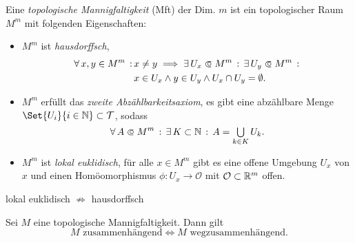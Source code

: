 \documentclass{cheat-sheet}
\newcommand{\Tau}{\mathcal{T}} %
\renewcommand{\O}{\mathcal{O}} %
\begin{document}


\begin{defn}
  Eine \emph{topologische Mannigfaltigkeit} (Mft) der Dim. $m$ ist ein topologischer Raum $M^m$ mit folgenden Eigenschaften:
  \begin{itemize}
    \item $M^m$ ist \emph{hausdorffsch}, \dh{}
    \begin{align*}
      \fa{x, y \in M^m} &x \not= y \implies \ex{U_x \opn M^m} \ex{U_y \opn M^m}\\
      &x \in U_x \wedge y \in U_y \wedge U_x \cap U_y = \emptyset.
    \end{align*}
    \item $M^m$ erfüllt das \emph{zweite Abzählbarkeitsaxiom}, \dh{} es gibt eine abzählbare Menge $\Set{ U_i }{ i \in \N } \subset \Tau$, sodass
    \[ \fa{A \opn M^m} \ex{K \subset \N} A = \bigcup_{k \in K} U_k. \]
    \item $M^m$ ist \emph{lokal euklidisch}, \dh{} für alle $x \in M^m$ gibt es eine offene Umgebung $U_x$ von $x$ und einen Homöomorphismus $\phi : U_x \to \O$ mit $\O \subset \R^m$ offen.
  \end{itemize}
\end{defn}

\begin{bem}
  lokal euklidisch $\not\Rightarrow$ hausdorffsch
\end{bem}

\begin{prop}
  Sei $M$ eine topologische Mannigfaltigkeit. Dann gilt
  \[ \text{$M$ zusammenhängend} \iff \text{$M$ wegzusammenhängend.} \]
\end{prop}
\end{document}
